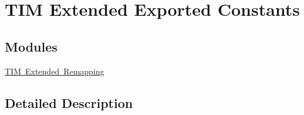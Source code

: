 \hypertarget{group___t_i_m_ex___exported___constants}{}\section{T\+IM Extended Exported Constants}
\label{group___t_i_m_ex___exported___constants}
\subsection*{Modules}
\begin{DoxyCompactItemize}
\item 
\mbox{\hyperlink{group___t_i_m_ex___remap}{T\+I\+M Extended Remapping}}
\end{DoxyCompactItemize}


\subsection{Detailed Description}
